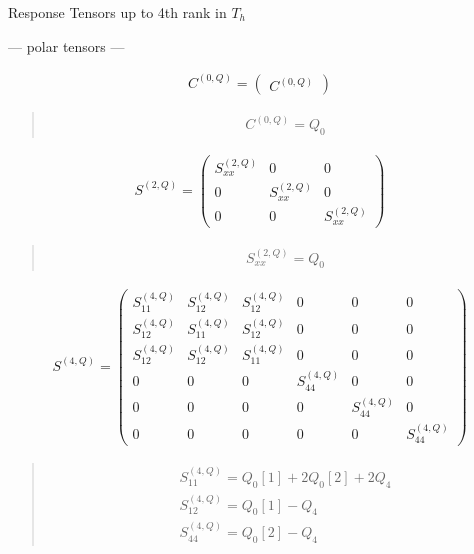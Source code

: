 \documentclass[fleqn,10pt]{jsarticle}
\begin{document}
\setcounter{MaxMatrixCols}{16}

\begin{center}
\LARGE
Response Tensors up to 4th rank in $T_{h}$
\end{center}
\begin{center}\LARGE --- polar tensors ---\end{center}
\begin{align*}
C^{(0,Q)} = \begin{pmatrix} C^{(0,Q)} \end{pmatrix}
\end{align*}
\begin{quote}
\begin{align*}
& C^{(0,Q)} = Q_{0}
\end{align*}
\end{quote}
\begin{align*}
S^{(2,Q)} = \begin{pmatrix} S^{(2,Q)}_{xx} & 0 & 0 \\ 0 & S^{(2,Q)}_{xx} & 0 \\ 0 & 0 & S^{(2,Q)}_{xx} \end{pmatrix}
\end{align*}
\begin{quote}
\begin{align*}
& S^{(2,Q)}_{xx} = Q_{0}
\end{align*}
\end{quote}
\begin{align*}
S^{(4,Q)} = \begin{pmatrix} S^{(4,Q)}_{11} & S^{(4,Q)}_{12} & S^{(4,Q)}_{12} & 0 & 0 & 0 \\ S^{(4,Q)}_{12} & S^{(4,Q)}_{11} & S^{(4,Q)}_{12} & 0 & 0 & 0 \\ S^{(4,Q)}_{12} & S^{(4,Q)}_{12} & S^{(4,Q)}_{11} & 0 & 0 & 0 \\ 0 & 0 & 0 & S^{(4,Q)}_{44} & 0 & 0 \\ 0 & 0 & 0 & 0 & S^{(4,Q)}_{44} & 0 \\ 0 & 0 & 0 & 0 & 0 & S^{(4,Q)}_{44} \end{pmatrix}
\end{align*}
\begin{quote}
\begin{align*}
& S^{(4,Q)}_{11} = Q_{0}[1] + 2 Q_{0}[2] + 2 Q_{4} \\
& S^{(4,Q)}_{12} = Q_{0}[1] - Q_{4} \\
& S^{(4,Q)}_{44} = Q_{0}[2] - Q_{4}
\end{align*}
\end{quote}
\end{document}
